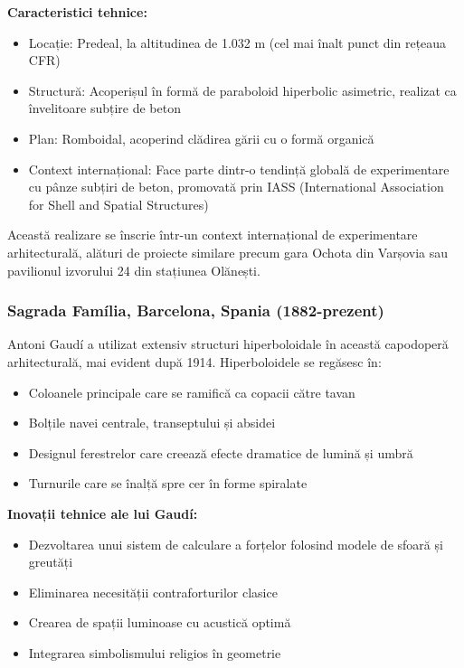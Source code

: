 \documentclass[12pt,a4paper]{article}
\begin{document}
\textbf{Caracteristici tehnice:}
\begin{itemize}
    \item Locație: Predeal, la altitudinea de 1.032 m (cel mai înalt punct din rețeaua CFR)
    \item Structură: Acoperișul în formă de paraboloid hiperbolic asimetric, realizat ca învelitoare subțire de beton
    \item Plan: Romboidal, acoperind clădirea gării cu o formă organică
    \item Context internațional: Face parte dintr-o tendință globală de experimentare cu pânze subțiri de beton, promovată prin IASS (International Association for Shell and Spatial Structures)
\end{itemize}

Această realizare se înscrie într-un context internațional de experimentare arhitecturală, alături de proiecte similare precum gara Ochota din Varșovia sau pavilionul izvorului 24 din stațiunea Olănești.

\subsubsection{Sagrada Família, Barcelona, Spania (1882-prezent)}

Antoni Gaudí a utilizat extensiv structuri hiperboloidale în această capodoperă arhitecturală, mai evident după 1914. Hiperboloidele se regăsesc în:

\begin{itemize}
    \item Coloanele principale care se ramifică ca copacii către tavan
    \item Bolțile navei centrale, transeptului și absidei
    \item Designul ferestrelor care creează efecte dramatice de lumină și umbră
    \item Turnurile care se înalță spre cer în forme spiralate
\end{itemize}

\textbf{Inovații tehnice ale lui Gaudí:}
\begin{itemize}
    \item Dezvoltarea unui sistem de calculare a forțelor folosind modele de sfoară și greutăți
    \item Eliminarea necesității contraforturilor clasice
    \item Crearea de spații luminoase cu acustică optimă
    \item Integrarea simbolismului religios în geometrie
\end{itemize}
\end{document}
